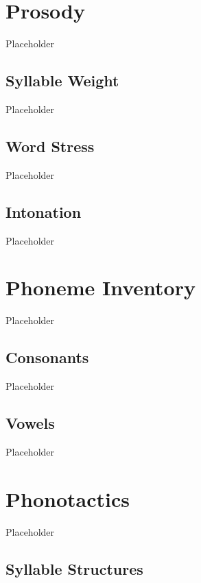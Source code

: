 \section{\langtvk{} Prosody}
\label{sec:tvk-prosody}

Placeholder

\subsection{Syllable Weight}
\label{subsec:tvk-syll-weight}

Placeholder

\subsection{Word Stress}
\label{subsec:tvk-word-stress}

Placeholder

\subsection{Intonation}
\label{subsec:tvk-intonation}

Placeholder

\section{\langank{} Phoneme Inventory}
\label{sec:ank-phone-inventory}

Placeholder

\subsection{Consonants}
\label{subsec:ank-consonants}

Placeholder

\subsection{Vowels}
\label{subsec:ank-vowels}

Placeholder

\section{\langank{} Phonotactics}
\label{sec:ank-phonotactics}

Placeholder

\subsection{Syllable Structures}
\label{subsec:ank-syll-struc}

